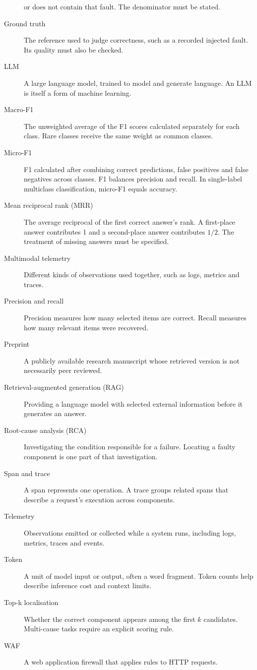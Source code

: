 \begin{description}
or does not contain that fault. The denominator must be stated.
\item[Ground truth] The reference used to judge correctness, such as a
recorded injected fault. Its quality must also be checked.
\item[LLM] A large language model, trained to model and generate language.
An LLM is itself a form of machine learning.
\item[Macro-F1] The unweighted average of the F1 scores calculated separately
for each class. Rare classes receive the same weight as common classes.
\item[Micro-F1] F1 calculated after combining correct predictions, false
positives and false negatives across classes. F1 balances precision and
recall. In single-label multiclass classification, micro-F1 equals accuracy.
\item[Mean reciprocal rank (MRR)] The average reciprocal of the first correct
answer's rank. A first-place answer contributes 1 and a second-place answer
contributes $1/2$. The treatment of missing answers must be specified.
\item[Multimodal telemetry] Different kinds of observations used together,
such as logs, metrics and traces.
\item[Precision and recall] Precision measures how many selected items are
correct. Recall measures how many relevant items were recovered.
\item[Preprint] A publicly available research manuscript whose retrieved
version is not necessarily peer reviewed.
\item[Retrieval-augmented generation (RAG)] Providing a language model with
selected external information before it generates an answer.
\item[Root-cause analysis (RCA)] Investigating the condition responsible for
a failure. Locating a faulty component is one part of that investigation.
\item[Span and trace] A span represents one operation. A trace groups related
spans that describe a request's execution across components.
\item[Telemetry] Observations emitted or collected while a system runs,
including logs, metrics, traces and events.
\item[Token] A unit of model input or output, often a word fragment. Token
counts help describe inference cost and context limits.
\item[Top-k localisation] Whether the correct component appears among the
first $k$ candidates. Multi-cause tasks require an explicit scoring rule.
\item[WAF] A web application firewall that applies rules to HTTP requests.
\end{description}
